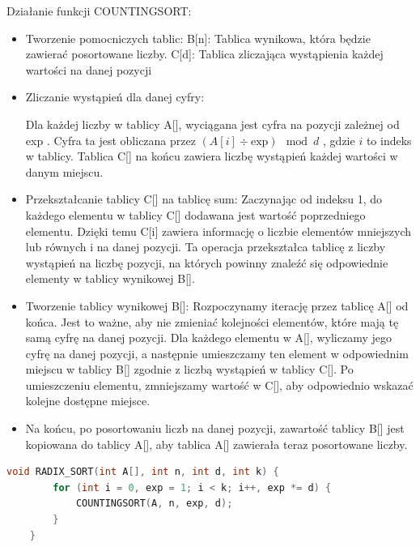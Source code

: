 \documentclass{article}
\begin{document}
		Działanie funkcji COUNTINGSORT:
		\begin{itemize}
			\item Tworzenie pomocniczych tablic:
			B[n]: Tablica wynikowa, która będzie zawierać posortowane liczby.
			C[d]: Tablica zliczająca wystąpienia każdej wartości na danej pozycji 
			
			\item Zliczanie wystąpień dla danej cyfry:
			
			Dla każdej liczby w tablicy A[], wyciągana jest cyfra na pozycji zależnej od exp . Cyfra ta jest obliczana przez $(A[i] \div \text{exp}) \mod d$  , gdzie \(i\) to indeks w tablicy.
			Tablica C[] na końcu zawiera liczbę wystąpień każdej wartości w danym miejscu.
			
			\item Przekształcanie tablicy C[] na tablicę sum:
			Zaczynając od indeksu 1, do każdego elementu w tablicy C[] dodawana jest wartość poprzedniego elementu.
			Dzięki temu C[i] zawiera informację o liczbie elementów mniejszych lub równych i na danej pozycji. Ta operacja przekształca tablicę z liczby wystąpień na liczbę pozycji, na których powinny znaleźć się odpowiednie elementy w tablicy wynikowej B[].
			
			\item Tworzenie tablicy wynikowej B[]:
			Rozpoczynamy iterację przez tablicę A[] od końca. Jest to ważne, aby nie zmieniać kolejności elementów, które mają tę samą cyfrę na danej pozycji.
			Dla każdego elementu w A[], wyliczamy jego cyfrę na danej pozycji, a następnie umieszczamy ten element w odpowiednim miejscu w tablicy B[] zgodnie z liczbą wystąpień w tablicy C[]. Po umieszczeniu elementu, zmniejszamy wartość w C[], aby odpowiednio wskazać kolejne dostępne miejsce.
			
			\item Na końcu, po posortowaniu liczb na danej pozycji, zawartość tablicy B[] jest kopiowana do tablicy A[], aby tablica A[] zawierała teraz posortowane liczby.
		\end{itemize}
		
		\begin{lstlisting}[language=C++, tabsize=3]
	void RADIX_SORT(int A[], int n, int d, int k) {
		for (int i = 0, exp = 1; i < k; i++, exp *= d) {
			COUNTINGSORT(A, n, exp, d);
		}
	}
		\end{lstlisting}
		
\end{document}
